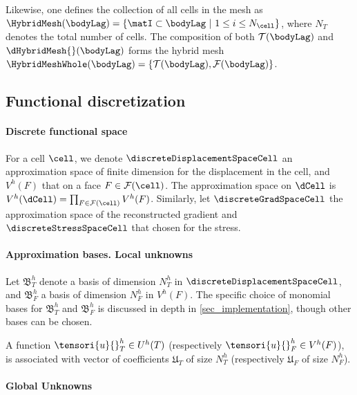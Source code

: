Likewise, one defines the collection of all cells in the mesh
as $\HybridMesh(\bodyLag) = \{ \matI \subset \bodyLag \ \vert \ 1 \leq i
\leq N_{\cell} \}$, where $N_T$ denotes the total number of cells. The
composition of both $\mathcal{T}(\bodyLag)$ and
$\dHybridMesh{}(\bodyLag)$ forms the hybrid mesh
$\HybridMeshWhole({\bodyLag}) = \{ \mathcal{T}(\bodyLag),
\mathcal{F}(\bodyLag) \}$.

\subsection{Functional discretization}

\paragraph{Discrete functional space}

For a cell $\cell$, we denote $\discreteDisplacementSpaceCell$ an
approximation space of finite dimension for the displacement in the
cell, and $V^h(F)$ that on a face $F \in \mathcal{F}(\cell)$. The
approximation space on $\dCell$ is $V^h(\dCell) = \prod_{F \in
  \mathcal{F}(\cell)} V^h(F)$. Similarly, let $\discreteGradSpaceCell$
the approximation space of the reconstructed gradient and
$\discreteStressSpaceCell$ that chosen for the stress.

\paragraph{Approximation bases. Local unknowns}

Let $\mathfrak{B}_T^h$ denote a basis of dimension $N_T^h$ in
$\discreteDisplacementSpaceCell$, and $\mathfrak{B}_F^h$ a basis of
dimension $N_F^h$ in $V^h(F)$. The specific choice of monomial bases for
$\mathfrak{B}_T^h$ and $\mathfrak{B}_F^h$ is discussed in depth in
\ref{sec_implementation}, though other bases can be chosen.

A function $\tensori{u}{}_{T}^h \in U^h(T)$ (respectively
$\tensori{u}{}_{F}^h \in V^h(F)$), is associated with vector of
coefficients $\mathfrak{U}_T$ of size $N_T^h$ (respectively
$\mathfrak{U}_F$ of size $N_F^h$).

\paragraph{Global Unknowns}

